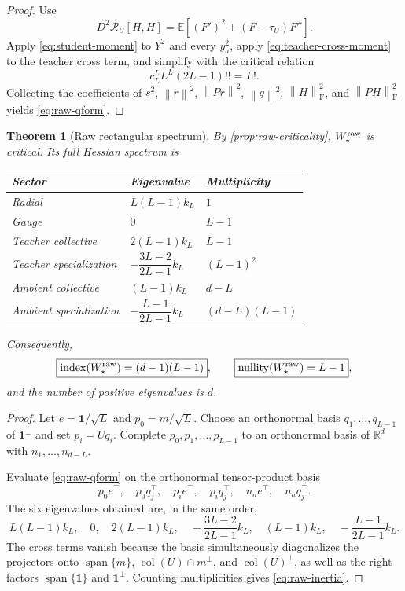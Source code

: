 \documentclass[11pt]{article}
\newtheorem{theorem}{Theorem}[section]
\newcommand{\R}{\mathbb{R}}
\newcommand{\one}{\mathbf{1}}
\newcommand{\ind}{\operatorname{index}}
\newcommand{\nul}{\operatorname{nullity}}
\newcommand{\col}{\operatorname{col}}
\newcommand{\Span}{\operatorname{span}}
\newcommand{\norm}[1]{\left\lVert #1\right\rVert}
\newcommand{\F}{\mathrm{F}}
\begin{document}
\begin{proof}
Use
\[
D^2\mathcal R_U[H,H]=\mathbb E[(F')^2+(F-\tau_U)F''].
\]
Apply \eqref{eq:student-moment} to $Y^2$ and every $y_a^2$, apply \eqref{eq:teacher-cross-moment} to the teacher cross term, and simplify with the critical relation
\[
c_L^L L^L(2L-1)!!=L!.
\]
Collecting the coefficients of $s^2$, $\norm r^2$, $\norm{Pr}^2$, $\norm q^2$, $\norm H_\F^2$, and $\norm{PH}_\F^2$ yields \eqref{eq:raw-qform}.
\end{proof}

\begin{theorem}[Raw rectangular spectrum]
\label{thm:raw-spectrum}
By \cref{prop:raw-criticality}, $W_\star^{\rm raw}$ is critical.  Its full Hessian spectrum is
\begin{center}
\begin{tabular}{@{}lll@{}}
\toprule
Sector & Eigenvalue & Multiplicity\\
\midrule
Radial & $L(L-1)k_L$ & $1$\\
Gauge & $0$ & $L-1$\\
Teacher collective & $2(L-1)k_L$ & $L-1$\\
Teacher specialization & $-\dfrac{3L-2}{2L-1}k_L$ & $(L-1)^2$\\
Ambient collective & $(L-1)k_L$ & $d-L$\\
Ambient specialization & $-\dfrac{L-1}{2L-1}k_L$ & $(d-L)(L-1)$\\
\bottomrule
\end{tabular}
\end{center}
Consequently,
\begin{equation}
\boxed{\ind(W_\star^{\rm raw})=(d-1)(L-1)},
\qquad
\boxed{\nul(W_\star^{\rm raw})=L-1},
\label{eq:raw-inertia}
\end{equation}
and the number of positive eigenvalues is $d$.
\end{theorem}

\begin{proof}
Let $e=\one/\sqrt L$ and $p_0=m/\sqrt L$.  Choose an orthonormal basis $q_1,\ldots,q_{L-1}$ of $\one^\perp$ and set $p_i=Uq_i$.  Complete $p_0,p_1,\ldots,p_{L-1}$ to an orthonormal basis of $\R^d$ with $n_1,\ldots,n_{d-L}$.

Evaluate \eqref{eq:raw-qform} on the orthonormal tensor-product basis
\[
p_0e^\top,
\quad p_0q_j^\top,
\quad p_ie^\top,
\quad p_iq_j^\top,
\quad n_ae^\top,
\quad n_aq_j^\top.
\]
The six eigenvalues obtained are, in the same order,
\[
L(L-1)k_L,
\quad0,
\quad2(L-1)k_L,
\quad-\frac{3L-2}{2L-1}k_L,
\quad(L-1)k_L,
\quad-\frac{L-1}{2L-1}k_L.
\]
The cross terms vanish because the basis simultaneously diagonalizes the projectors onto $\Span\{m\}$, $\col(U)\cap m^\perp$, and $\col(U)^\perp$, as well as the right factors $\Span\{\one\}$ and $\one^\perp$.  Counting multiplicities gives \eqref{eq:raw-inertia}.
\end{proof}
\end{document}
